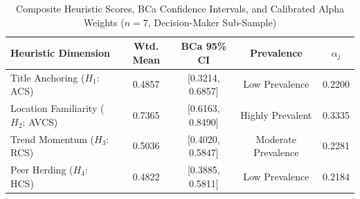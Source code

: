 \begin{table}[htbp]
\centering
\caption{Composite Heuristic Scores, BCa Confidence Intervals, and Calibrated Alpha Weights ($n=7$, Decision-Maker Sub-Sample)}
\label{tab:heuristic_scores}
\begin{tabular}{lcccc}
\hline
\textbf{Heuristic Dimension} & \textbf{Wtd. Mean} & \textbf{BCa 95\% CI} & \textbf{Prevalence} & \textbf{$\alpha_j$} \\
\hline
Title Anchoring ($H_1$: ACS)   & 0.4857 & [0.3214, 0.6857] & Low Prevalence & 0.2200 \\
Location Familiarity ($H_2$: AVCS) & 0.7365 & [0.6163, 0.8490] & Highly Prevalent & 0.3335 \\
Trend Momentum ($H_3$: RCS)    & 0.5036 & [0.4020, 0.5847] & Moderate Prevalence & 0.2281 \\
Peer Herding ($H_4$: HCS)      & 0.4822 & [0.3885, 0.5811] & Low Prevalence & 0.2184 \\
\hline
\end{tabular}
\end{table}
